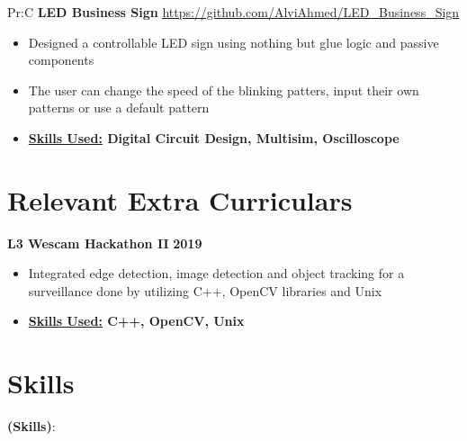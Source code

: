 \documentclass[11pt]{article}
\newcommand{\spaces}{1em}
\begin{document}
Pr:C
\textbf{LED Business Sign}
\underline{\url{https://github.com/AlviAhmed/LED_Business_Sign}}
\begin{itemize}[noitemsep,nolistsep]
\item Designed a controllable LED sign using nothing but glue logic and passive components
\item The user can change the speed of the blinking patters, input their own patterns or
  use a default pattern
\item \textbf{ \underline{Skills Used:} Digital Circuit Design, Multisim, Oscilloscope}
\end{itemize}


 
        \section*{Relevant Extra Curriculars}
            \textbf{L3 Wescam Hackathon II}  \hfill \textbf{2019}
            \begin{itemize}[noitemsep,nolistsep]
              \item Integrated edge detection, image detection and object tracking for a
                surveillance done by utilizing C++, OpenCV libraries and Unix
              \item \textbf{\underline{Skills Used:} C++, OpenCV, Unix}
	            \end{itemize}
                    \vspace{\spaces}
            

          \section*{Skills}

          \vspace{\spaces}

          \textbf{(Skills)}:
          
          \vspace{\spaces}
          


			                          
\end{document}
